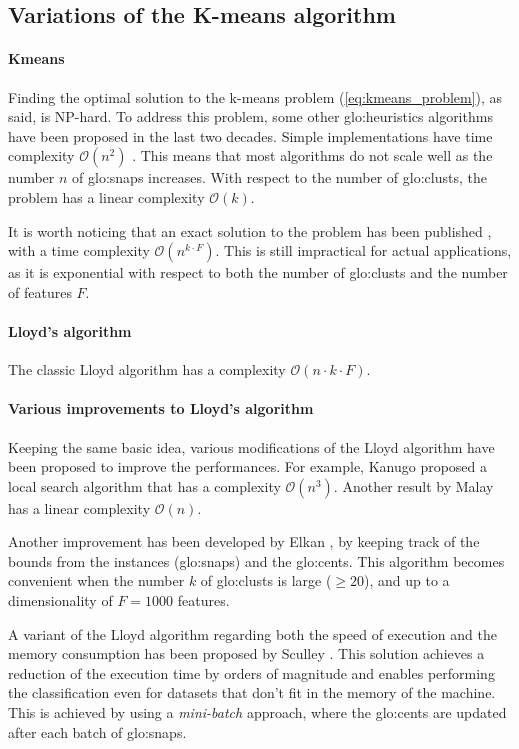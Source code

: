 \subsection{Variations of the K-means algorithm}
\label{sec:kmeans_improvements}
\paragraph*{Kmeans}
Finding the optimal solution to the k-means problem (\autoref{eq:kmeans_problem}), as said, is NP-hard.
To address this problem, some other {\gls{glo:heuristic}}s algorithms have been proposed in the last two decades. Simple implementations have time complexity $\mathcal{O}(n^2)$ \cite{Kmeans_linear}.  This means that most algorithms do not scale well as the number $n$ of {\gls{glo:snap}}s increases. With respect to the number of \gls{glo:clust}s, the problem has a linear complexity $\mathcal{O}(k)$.

It is worth noticing that an exact solution to the problem has been published \cite{Kmeans_vornoi_japan}, with a time complexity $\mathcal{O}(n^{k\cdot F})$. This is still impractical for actual applications, as it is exponential with respect to both the number of \gls{glo:clust}s and the number of features $F$.

\paragraph*{Lloyd's algorithm}
The classic Lloyd algorithm \cite{Lloyd1982} has a complexity $\mathcal{O}(n\cdot k\cdot F )$.

\paragraph*{Various improvements to Lloyd's algorithm} Keeping the same basic idea, various modifications of the Lloyd algorithm have been proposed to improve the performances. For example, Kanugo \cite{kanungo2004local} proposed a local search algorithm that has a complexity $\mathcal{O}(n^3)$. Another result by Malay \cite{Kmeans_linear} has a linear complexity $\mathcal{O}(n)$. 

Another improvement has been developed by Elkan \cite{kmeans-accelerated}, by keeping track of the bounds from the instances ({\gls{glo:snap}}s) and the {\gls{glo:cent}}s. This algorithm becomes convenient when the number $k$ of \gls{glo:clust}s is large ($\geq 20$), and up to a dimensionality of $F=1000$ features.

A variant of the Lloyd algorithm regarding both the speed of execution and the memory consumption has been proposed by Sculley \cite{Sculley2010}. This solution achieves a reduction of the execution time by orders of magnitude and enables performing the classification even for datasets that don't fit in the memory of the machine. This is achieved by using a \emph{mini-batch} approach, where the {\gls{glo:cent}}s are updated after each batch of {\gls{glo:snap}}s.


